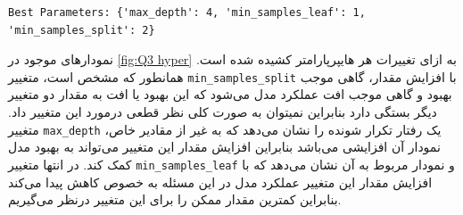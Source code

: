 \documentclass{article}
\begin{document}
\begin{LTR}
\begin{verbatim}
Best Parameters: {'max_depth': 4, 'min_samples_leaf': 1, 'min_samples_split': 2}
\end{verbatim}
\end{LTR}

نمودارهای موجود در 
\autoref{fig:Q3 hyper}
به ازای تغییرات هر هایپرپارامتر کشیده شده است. همانطور که مشخص است، متغییر 
\texttt{min\_samples\_split}
با افزایش مقدار، گاهی موجب بهبود و گاهی موجب افت عملکرد مدل می‌شود که این بهبود یا افت به مقدار دو متغییر دیگر بستگی دارد بنابراین نمیتوان به صورت کلی نظر قطعی درمورد این متغییر داد.
متغییر 
\texttt{max\_depth}
یک رفتار تکرار شونده را نشان می‌دهد که به غیر از مقادیر خاص، نمودار آن افزایشی می‌باشد بنابراین افزایش مقدار این متغییر می‌تواند به بهبود مدل کمک کند.
در انتها متغییر
\texttt{min\_samples\_leaf}
و نمودار مربوط به آن نشان می‌دهد که با افزایش مقدار این متغییر عملکرد مدل در این مسئله به خصوص کاهش پیدا می‌کند بنابراین کمترین مقدار ممکن را برای این متغییر درنظر می‌گیریم. 
\end{document}
